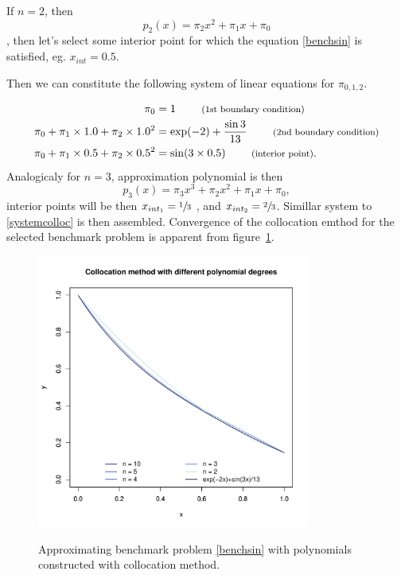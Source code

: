 If $n=2$, then 
\begin{equation}p_{2}(x) = \pi_{2}x^{2} +\pi_{1}x + \pi_{0}\end{equation},
then let's select some interior point for which the equation 
\eqref{benchsin} is 
satisfied, eg. $x_{int}=0.5$.

Then we can constitute the following system of linear equations for 
$\pi_{0,1,2}$.

\begin{equation}
 \label{systemcolloc} 
 \begin{split}
  \pi_{0} &= 1 \qquad \mbox{ \footnotesize(1st boundary condition)} \\
  \pi_{0} + \pi_{1} \times 1.0 + \pi_{2} \times 1.0^{2} &=  \exp(-2) + 
  \frac{\sin 3}{13} \qquad  \mbox{ \footnotesize(2nd boundary condition)} \\
  \pi_{0} + \pi_{1}\times 0.5 + \pi_{2} \times 0.5^{2} &= \sin (3 
  \times 0.5) \qquad \mbox{ \footnotesize(interior point)}.
 \end{split} 
\end{equation}
Analogicaly for $n=3$, approximation polynomial is then
\begin{equation}p_{3}(x) = \pi_{3}x^{3} + \pi_{2}x^{2} +\pi_{1}x + 
\pi_{0},\end{equation} interior points will be then
$x_{int_{1}}=\sfrac{1}{3}$ , and $x_{int_{2}}=\sfrac{2}{3}$. Simillar 
system to \eqref{systemcolloc} is then assembled. Convergence of the 
collocation emthod for the selected benchmark problem is apparent from 
figure~\ref{collocconv}.
\begin{figure}
\centering
 \includegraphics[width=9cm]{images1/collocation_adv_numerics.pdf}
 \label{collocconv}
 \caption{Approximating benchmark problem \eqref{benchsin} with 
 polynomials constructed with collocation method.}
\end{figure}

